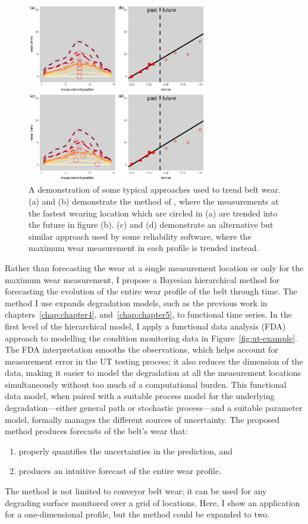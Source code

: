 \begin{figure}[h]
  \centering
  \includegraphics[width=0.7\textwidth]{figures/ch-6/current_approach.pdf}
  \caption{A demonstration of some typical approaches used to trend belt wear. (a) and (b) demonstrate the method of \citep{webb_2020}, where the measurements at the fastest wearing location which are circled in (a) are trended into the future in figure (b). (c) and (d) demonstrate an alternative but similar approach used by some reliability software, where the maximum wear measurement in each profile is trended instead.}
  \label{fig:linear-trend-demo}
\end{figure}

Rather than forecasting the wear at a single measurement location or only for the maximum wear measurement, I propose a Bayesian hierarchical method for forecasting the evolution of the entire wear profile of the belt through time. The method I use expands degradation models, such as the previous work in chapters~\ref{chap:chapter4}, and~\ref{chap:chapter5}, to functional time series. In the first level of the hierarchical model, I apply a functional data analysis (FDA) approach to modelling the condition monitoring data in Figure~\ref{fig:ut-example}. The FDA interpretation smooths the observations, which helps account for measurement error in the UT testing process; it also reduces the dimension of the data, making it easier to model the degradation at all the measurement locations simultaneously without too much of a computational burden. This functional data model, when paired with a suitable process model for the underlying degradation---either general path or stochastic process---and a suitable parameter model, formally manages the different sources of uncertainty. The proposed method produces forecasts of the belt's wear that:
\begin{enumerate}
  \item properly quantifies the uncertainties in the prediction, and
  \item produces an intuitive forecast of the entire wear profile.
\end{enumerate}
The method is not limited to conveyor belt wear; it can be used for any degrading surface monitored over a grid of locations. Here, I show an application for a one-dimensional profile, but the method could be expanded to two.


